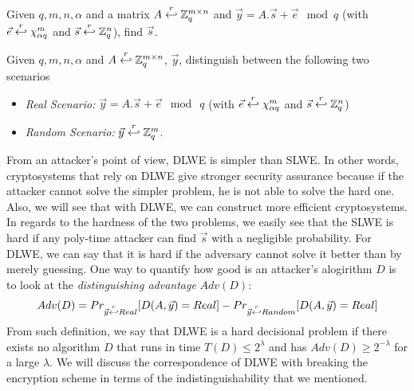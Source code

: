 \begin{description}
            \begin{definition}
                 Given $q,m,n,\alpha$ and a matrix
                $A \stackrel{r}{\hookleftarrow} \mathbb{Z}_q^{m \times n}$ and $\vec{y} =
                A.\vec{s} + \vec{e} \mod q$ (with $\vec{e} \stackrel{r}{\hookleftarrow}
                    \chi_{\alpha q}^m$ and $\vec{s} \stackrel{r}{\hookleftarrow}
                \mathbb{Z}_q^n$), find $\vec{s}$.
                \label{def:Search-LWEProb}
            \end{definition}

            \begin{definition}
                 Given $q, m, n,
                \alpha$ and $A \stackrel{r}{\hookleftarrow} \mathbb{Z}_q^{m \times n}$,
                $\vec{y}$, distinguish between the following two scenarios
                \begin{itemize}
                    \item \emph{Real Scenario:} $\vec{y} = A.\vec{s} +
                    \vec{e} \mod \ q$ (with $\vec{e} \stackrel{r}{\hookleftarrow}
                    \chi_{\alpha q}^m$  and $\vec{s} \stackrel{r}{\hookleftarrow}
                    \mathbb{Z}_q^n$)
                \item \emph{Random Scenario:} $\vec{y} \stackrel{r}{\hookleftarrow}
                    \mathbb{Z}_q^m$.
                \end{itemize}
                \label{def:Decision-LWEProb}
            \end{definition}

            From an attacker's point of view, DLWE is simpler than
            SLWE. In other words, cryptosystems that rely on DLWE give stronger
            security assurance because if the attacker cannot solve the simpler
            problem, he is not able to solve the hard one. Also, we will see
            that with DLWE, we can construct more efficient cryptosystems. In
            regards to the hardness of the two problems,
            we easily see that the SLWE is hard if any poly-time attacker can
            find $\vec{s}$ with a negligible probability. For DLWE, we can
            say that it is hard if the adversary cannot solve it better than
            by merely guessing. One way to quantify how good is an attacker's
            alogirithm $D$ is to look at the \emph{distinguishing advantage}
            $Adv(D)$:
            \[
                Adv(D) = Pr_{\vec{y}\stackrel{r}{\hookleftarrow} Real}[D(A,\vec{y}) = Real] -
                Pr_{\vec{y}\stackrel{r}{\hookleftarrow} Random}[D(A,\vec{y}) = Real]
            \]
            From such definition, we say that DLWE is a hard decisional problem
            if there exists no
            algorithm $D$ that runs in time $T(D) \leq 2^\lambda$ and has
            $Adv(D) \geq 2^{-\lambda}$ for a large $\lambda$. We will discuss
            the correspondence of DLWE with
            breaking the encryption scheme in terms of the
            indistinguishability that we mentioned.


\end{description}
